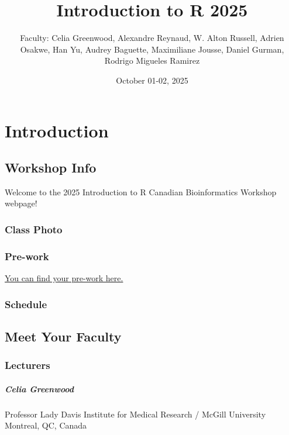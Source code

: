\documentclass[
]{book}
\title{Introduction to R 2025}
\author{Faculty: Celia Greenwood, Alexandre Reynaud, W. Alton Russell, Adrien Osakwe, Han Yu, Audrey Baguette, Maximiliane Jousse, Daniel Gurman, Rodrigo Migueles Ramirez}
\date{October 01-02, 2025}
\begin{document}
\maketitle

{
\setcounter{tocdepth}{1}
\tableofcontents
}
\part{Introduction}\label{part-introduction}

\chapter{Workshop Info}\label{workshop-info}

Welcome to the 2025 Introduction to R Canadian Bioinformatics Workshop webpage!

\section{Class Photo}\label{class-photo}

\section{Pre-work}\label{pre-work}

\href{https://docs.google.com/forms/d/e/1FAIpQLSdqzz503MPixGxHCbMSvXJCsZyQ8yWG9g1NIO2SexwJL9JUzw/viewform?usp=share_link&ouid=101140812887781190012}{You can find your pre-work here.}

\section{Schedule}\label{schedule}

\chapter{Meet Your Faculty}\label{meet-your-faculty}

\section{Lecturers}\label{lecturers}

\subsubsection{Celia Greenwood}\label{celia-greenwood}

Professor
Lady Davis Institute for Medical Research / McGill University
Montreal, QC, Canada
\end{document}

